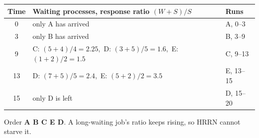\begin{center}
\renewcommand{\arraystretch}{1.3}
\begin{tabular}{@{}c l l@{}}
\toprule
\textbf{Time} & \textbf{Waiting processes, response ratio $(W+S)/S$} & \textbf{Runs} \\
\midrule
0 & only A has arrived & A, 0--3 \\
3 & only B has arrived & B, 3--9 \\
9 & C: $(5+4)/4 = 2.25$,\ D: $(3+5)/5 = 1.6$,\ E: $(1+2)/2 = 1.5$ & C, 9--13 \\
13 & D: $(7+5)/5 = 2.4$,\ E: $(5+2)/2 = 3.5$ & E, 13--15 \\
15 & only D is left & D, 15--20 \\
\bottomrule
\end{tabular}

\medskip
{}
\end{center}
\noindent Order \textbf{A B C E D}. A long-waiting job's ratio keeps rising, so HRRN cannot starve it.
